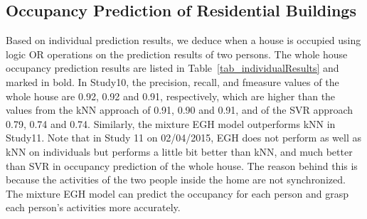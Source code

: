 \subsection{Occupancy Prediction of Residential Buildings}
Based on individual prediction results, we deduce when a house is occupied
using logic OR operations on the prediction results of two persons. 
The whole house occupancy prediction results are listed in 
Table~\ref{tab_individualResults} and marked in bold. 
In Study10, the precision, recall, and fmeasure values of the whole house are 0.92, 0.92 and 0.91, respectively,  
which are higher than the values from the kNN approach of 0.91, 0.90 and 0.91, and of the SVR approach 0.79, 0.74 and 0.74. Similarly, the mixture EGH model outperforms kNN in Study11. 
Note that in Study 11 on 02/04/2015, 
EGH does not perform as well as kNN on individuals
but performs a little bit better than kNN, and much better than SVR in occupancy prediction of the whole house. 
The reason behind this is because the activities of the two people inside the home 
are not synchronized. The mixture EGH model can predict the 
occupancy for each person and grasp each person's activities more accurately. 

